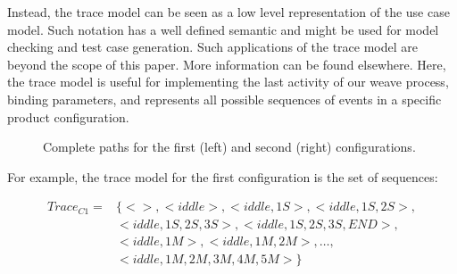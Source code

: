\documentclass{acm_proc_article-sp}
\begin{document}
\begin{description}
\begin{enumerate}
Instead, the trace model can be seen as a low level representation of the use case model. Such notation has a well defined semantic and might 
be used for model checking and test case generation. Such applications of the trace model are beyond the scope of this paper. More information 
can be found elsewhere\cite{csp-hoare,csp-roscoe,cfeitosa-sbmf-2006}. Here, the trace model is useful for implementing the last activity of our weave process, binding parameters, and 
represents all possible sequences of events in a specific product configuration. 


 
\begin{figure}[t]
\begin{center}
\begin{tiny}
\begin{xy}
\end{xy}
\end{tiny}
\caption{Complete paths for the first (left) and second (right) configurations.}
\label{fig:complete-paths}
\end{center}
\end{figure}

For example, the trace model for the first configuration is the set of sequences:

\begin{small}
\begin{eqnarray*}
Trace_{C1} = & \{<>, <iddle>, <iddle, 1S>, <iddle, 1S,2S>, \\ 
                    & <iddle,1S,2S,3S>,  <iddle,1S,2S,3S,END>, \\ 
                    & <iddle, 1M>, <iddle, 1M,2M>, \ldots, \\ 
                    & <iddle, 1M, 2M,3M,4M,5M> \}
\end{eqnarray*}
\end{small}
 

\end{enumerate}
\end{description}
\end{document}
